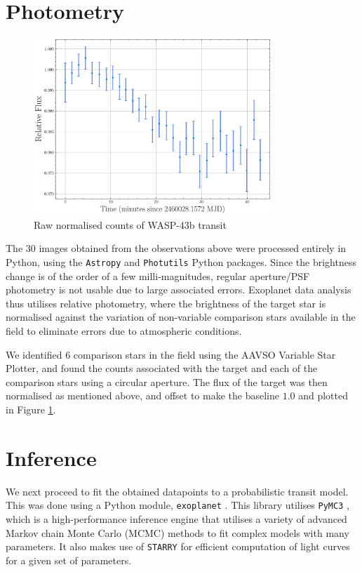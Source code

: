 \documentclass[12pt]{article}
\begin{document}
\section{Photometry}

\begin{figure}[h]
    \centering
    \includegraphics[width = 0.8\textwidth]{./images/raw.pdf}
    \caption{Raw normalised counts of WASP-43b transit}
    \label{raw}
\end{figure}

The 30 images obtained from the observations above were processed entirely in Python, using the \texttt{Astropy} \citep{astropy:2022} and \texttt{Photutils} \citep{larry_bradley_2022_6825092} Python packages. Since the brightness change is of the order of a few milli-magnitudes, regular aperture/PSF photometry is not usable due to large associated errors. Exoplanet data analysis thus utilises relative photometry, where the brightness of the target star is normalised against the variation of non-variable comparison stars available in the field to eliminate errors due to atmospheric conditions. 

We identified $6$ comparison stars in the field using the AAVSO Variable Star Plotter, and found the counts associated with the target and each of the comparison stars using a circular aperture. The flux of the target was then normalised as mentioned above, and offset to make the baseline $1.0$ and plotted in Figure \ref{raw}.

\section{Inference}
We next proceed to fit the obtained datapoints to a probabilistic transit model. This was done using a Python module, \texttt{exoplanet} \citep{exoplanet:joss}. This library utilises \texttt{PyMC3} \citep{exoplanet:pymc3}, which is a high-performance inference engine that utilises a variety of advanced Markov chain Monte Carlo (MCMC) methods to fit complex models with many parameters. It also makes use of \texttt{STARRY} \citep{exoplanet:luger18} for efficient computation of light curves for a given set of parameters. 
\end{document}
